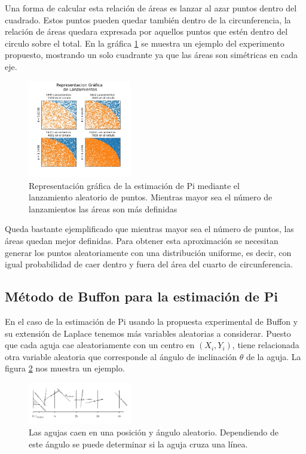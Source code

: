 \documentclass{rbf}
\begin{document}
Una forma de calcular esta relación de áreas es lanzar al azar puntos dentro del cuadrado. Estos puntos pueden quedar también dentro de la circunferencia, la relación de áreas quedara expresada por aquellos puntos que estén dentro del circulo sobre el total.
En la gráfica \ref{area} se muestra un ejemplo del experimento propuesto, mostrando un solo cuadrante ya que las áreas son simétricas en cada eje.

\begin{figure}[htbp!]
 \centering
  \includegraphics[width=0.4\textwidth]{figures/areas.jpg}
	\caption{Representación gráfica de la estimación de Pi mediante el lanzamiento aleatorio de puntos. Mientras mayor sea el número de lanzamientos las áreas son más definidas}
 \label{area}
\end{figure}

Queda bastante ejemplificado que mientras mayor sea el número de puntos, las áreas quedan mejor definidas.
Para obtener esta aproximación se necesitan generar los puntos aleatoriamente con una distribución uniforme, es decir, con igual probabilidad de caer dentro y fuera del área del cuarto de circunferencia.

\subsection{Método de Buffon para la estimación de Pi}

En el caso de la estimación de Pi usando la propuesta experimental de Buffon y su extensión de Laplace tenemos más variables aleatorias a considerar. Puesto que cada aguja cae aleatoriamente con un centro en $(X_i,Y_i)$, tiene relacionada otra variable aleatoria que corresponde al ángulo de inclinación $\theta$ de la aguja. La figura \ref{aguja} nos muestra un ejemplo.



\begin{figure}[tbp!]
 \centering
  \includegraphics[width=0.4\textwidth]{figures/agujas.jpg}
	\caption{Las agujas caen en una posición y ángulo aleatorio. Dependiendo de este ángulo se puede determinar si la aguja cruza una línea.\cite{Statistics}}
 \label{aguja}
\end{figure}
\end{document}
